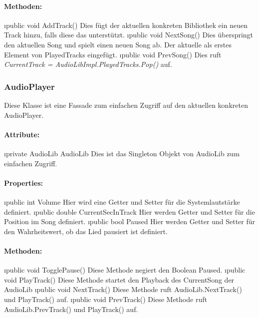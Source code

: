 \documentclass[../entwurf.tex]{subfiles}
\begin{document}
				\paragraph{Methoden:}
					\begin{itemize}
						\i{public void AddTrack()} Dies fügt der aktuellen konkreten Bibliothek ein neuen Track hinzu,
						falls diese das unterstützt.
						\i{public void NextSong()} Dies überspringt den aktuellen Song und spielt einen neuen Song ab.
						Der aktuelle als erstes Element von PlayedTracks eingefügt.
						\i{public void PrevSong()} Dies ruft \textit{CurrentTrack = AudioLibImpl.PlayedTracks.Pop()} auf.
					\end{itemize}
			\subsubsection{AudioPlayer}
				Diese Klasse ist eine Fassade zum einfachen Zugriff auf den aktuellen konkreten AudioPlayer.
				\paragraph{Attribute:}
					\begin{itemize}
						\i{private AudioLib AudioLib} Dies ist das Singleton Objekt von AudioLib zum einfachen Zugriff.
					\end{itemize}
				\paragraph{Properties:}
					\begin{itemize}
						\i{public int Volume} Hier wird eine Getter und Setter für die Systemlautstärke definiert.
						\i{public double CurrentSecInTrack} Hier werden Getter und Setter für die Position im Song definiert.
						\i{public bool Paused} Hier werden Getter und Setter für den Wahrheitswert, ob das Lied pausiert ist definiert.
					\end{itemize}
				\paragraph{Methoden:}
					\begin{itemize}
						\i{public void TogglePause()} Diese Methode negiert den Boolean Paused.
						\i{public void PlayTrack()} Diese Methode startet den Playback des CurrentSong der AudioLib
						\i{public void NextTrack()} Diese Methode ruft AudioLib.NextTrack() und PlayTrack() auf.
						\i{public void PrevTrack()} Diese Methode ruft AudioLib.PrevTrack() und PlayTrack() auf.
					\end{itemize}
\end{document}
